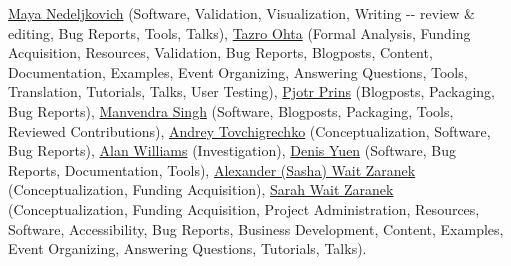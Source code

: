 \documentclass[sigconf,revew,screen,timestamp,nonacm]{acmart}
\newcommand{\contributor}[3]
{\normalsize\href{#1}{#2} \small(#3)\normalsize}
\begin{document}
\begin{acks}
\contributor{https://orcid.org/0000-0003-3705-948X}{Maya Nedeljkovich}{Software, Validation, Visualization, Writing -\/- review \& editing, Bug Reports, Tools, Talks},
\contributor{https://orcid.org/0000-0003-3777-5945}{Tazro Ohta}{Formal Analysis, Funding Acquisition, Resources, Validation, Bug Reports, Blogposts, Content, Documentation, Examples, Event Organizing, Answering Questions, Tools, Translation, Tutorials, Talks, User Testing},
\contributor{https://orcid.org/0000-0002-8021-9162}{Pjotr Prins}{Blogposts, Packaging, Bug Reports},
\contributor{https://orcid.org/0000-0001-9279-9910}{Manvendra Singh}{Software, Blogposts, Packaging, Tools, Reviewed Contributions},
\contributor{https://orcid.org/0000-0002-0959-4429}{Andrey Tovchigrechko}{Conceptualization, Software, Bug Reports},
\contributor{https://orcid.org/0000-0003-3156-2105}{Alan Williams}{Investigation},
\contributor{https://orcid.org/0000-0002-6130-1021}{Denis Yuen}{Software, Bug Reports, Documentation, Tools},
\contributor{https://orcid.org/0000-0002-0415-9655}{Alexander (Sasha) Wait Zaranek}{Conceptualization, Funding Acquisition},
\contributor{https://orcid.org/0000-0003-4716-9121}{Sarah Wait Zaranek}{Conceptualization, Funding Acquisition, Project Administration, Resources, Software, Accessibility, Bug Reports, Business Development, Content, Examples, Event Organizing, Answering Questions, Tutorials, Talks}.


\end{acks}
\end{document}
